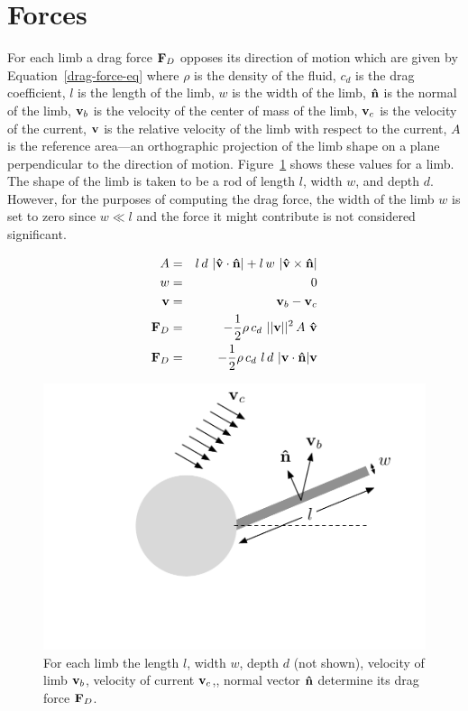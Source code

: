 \section{Forces}

For each limb a drag force $\mathbf{F}_D$ opposes its direction of motion
which are given by Equation~\ref{drag-force-eq} where $\rho$ is the
density of the fluid, $c_d$ is the drag coefficient, $l$ is the length
of the limb, $w$ is the width of the limb, $\mathbf{\hat{n}}$ is the normal of
the limb, $\mathbf{v}_b$ is the velocity of the center of mass of the limb,
$\mathbf{v}_c$ is the velocity of the current, $\mathbf{v}$ is the relative
velocity of the limb with respect to the current, $A$ is the reference
area---an orthographic projection of the limb shape on a plane
perpendicular to the direction of motion.  Figure~\ref{drag-force}
shows these values for a limb.  The shape of the limb is taken to be a
rod of length $l$, width $w$, and depth $d$.  However, for the
purposes of computing the drag force, the width of the limb $w$ is set
to zero since $w \ll l$ and the force it might contribute is not
considered significant.

\begin{eqnarray}
  A &=& l\,d~ |\mathbf{\hat{v}} \cdot \mathbf{\hat{n}}| + l\, w~|\mathbf{\hat{v}} \times \mathbf{\hat{n}}|\\
  w &=& 0 \\
  \mathbf{v} &=& \mathbf{v}_b - \mathbf{v}_c \\
  \mathbf{F}_D &=& -\frac{1}{2} \rho\,c_d~||\mathbf{v}||^2\,A~\mathbf{\hat{v}} \\
  \mathbf{F}_D &=& -\frac{1}{2} \rho\, c_d~ l\,d~|\mathbf{v} \cdot \mathbf{\hat{n}}|\mathbf{v} \label{drag-force-eq} 
\end{eqnarray}


\begin{figure}[h]  
  \centering
  \includegraphics[scale=0.7]{fig/drag-force.pdf} 
  \vspace{-45pt}
  \caption[Diagram of drag force]{\label{drag-force}For each limb the
    length $l$, width $w$, depth $d$ (not shown), velocity of limb
    $\mathbf{v}_b $, velocity of current $\mathbf{v}_c$,, normal vector $\mathbf{\hat{n}}$
    determine its drag force $\mathbf{F}_D$.}
\end{figure}

